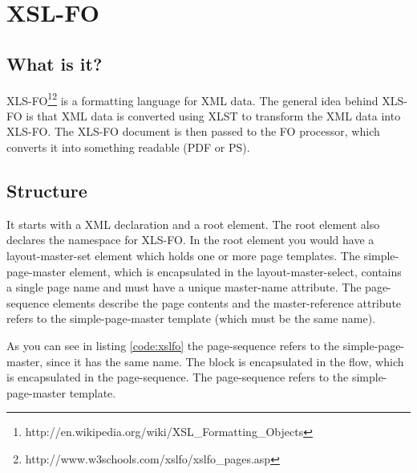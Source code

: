 \chapter{XSL-FO}
\label{chap:xsl-fo}

\section{What is it?}

XLS-FO\footnote{http://en.wikipedia.org/wiki/XSL\_Formatting\_Objects}\footnote{http://www.w3schools.com/xslfo/xslfo\_pages.asp} is a formatting language for XML data. The general idea behind XLS-FO is that XML data is converted using XLST to transform the XML data into XLS-FO. The XLS-FO document is then passed to the FO processor, which converts it into something readable (PDF or PS). 

\section{Structure}

It starts with a XML declaration and a root element. The root element also declares the namespace for XLS-FO. In the root element you would have a layout-master-set element which holds one or more page templates. The simple-page-master element, which is encapsulated in the layout-master-select, contains a single page name and must have a unique master-name attribute. The page-sequence elements describe the page contents and the master-reference attribute refers to the simple-page-master template (which must be the same name). 



As you can see in listing \ref{code:xslfo} the page-sequence refers to the simple-page-master, since it has the same name. The block is encapsulated in the flow, which is encapsulated in the page-sequence. The page-sequence refers to the simple-page-master template.